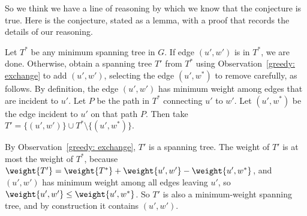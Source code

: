 So we think we have a line of reasoning by which we know that the conjecture is true.
Here is the conjecture, stated as a lemma,
with a proof that records the details of our reasoning.
\begin{lemma}\label{greedy: lemma: Prim} \PRIMRULE
\end{lemma}
\begin{shortFormProof}
  Let $T^*$ be any minimum spanning tree in $G$.
  If edge $(u', w')$ is in $T^*$, we are done.
  Otherwise, obtain a spanning tree $T'$ from $T^*$ using Observation~\ref{greedy: exchange}
  to add $(u', w')$, selecting the edge $(u', w^*)$ to remove carefully, as follows.
  By definition, the edge $(u', w')$ has minimum weight
  among edges that are incident to $u'$.
  Let $P$ be the path in $T^*$ connecting $u'$ to $w'$.
  Let $(u', w^*)$ be the edge incident to $u'$ on that path $P$.
  Then take $T' = \{(u', w')\} \cup T^* \setminus \{(u', w^*)\}$.

  By Observation~\ref{greedy: exchange},
  $T'$ is a spanning tree.  
  The weight of $T'$ is at most the weight of $T^*$,
  because $\weight {T'} = \weight {T^*} + \weight {u',w'} - \weight {u', w^*}$,
  and $(u', w')$ has minimum weight among all edges leaving $u'$,
  so $\weight {u', w'} \le \weight {u', w^*}$.
  So $T'$ is also a minimum-weight spanning tree,
  and by construction it contains $(u', w')$.
\end{shortFormProof}



